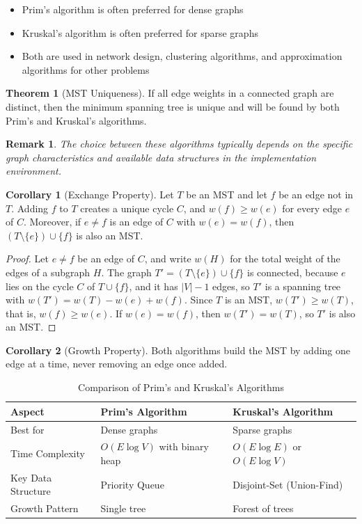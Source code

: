 \documentclass{article}
\newtheorem{remark}{Remark}
\theoremstyle{definition}
\newtheorem{theorem}{Theorem}
\newtheorem{corollary}{Corollary}
\begin{document}
\begin{itemize}
\item Prim's algorithm is often preferred for dense graphs
\item Kruskal's algorithm is often preferred for sparse graphs
\item Both are used in network design, clustering algorithms, and approximation algorithms for other problems
\end{itemize}

\begin{theorem}[MST Uniqueness]
If all edge weights in a connected graph are distinct, then the minimum spanning tree is unique and will be found by both Prim's and Kruskal's algorithms.
\end{theorem}

\begin{remark}
The choice between these algorithms typically depends on the specific graph characteristics and available data structures in the implementation environment.
\end{remark}

\begin{corollary}[Exchange Property]
Let $T$ be an MST and let $f$ be an edge not in $T$. Adding $f$ to $T$ creates a unique cycle $C$, and $w(f) \geq w(e)$ for every edge $e$ of $C$. Moreover, if $e \neq f$ is an edge of $C$ with $w(e) = w(f)$, then $(T \setminus \{e\}) \cup \{f\}$ is also an MST.
\end{corollary}
\begin{proof}
Let $e \neq f$ be an edge of $C$, and write $w(H)$ for the total weight of the edges of a subgraph $H$. The graph $T' = (T \setminus \{e\}) \cup \{f\}$ is connected, because $e$ lies on the cycle $C$ of $T \cup \{f\}$, and it has $|V| - 1$ edges, so $T'$ is a spanning tree with $w(T') = w(T) - w(e) + w(f)$. Since $T$ is an MST, $w(T') \geq w(T)$, that is, $w(f) \geq w(e)$. If $w(e) = w(f)$, then $w(T') = w(T)$, so $T'$ is also an MST.
\end{proof}

\begin{corollary}[Growth Property]
Both algorithms build the MST by adding one edge at a time, never removing an edge once added.
\end{corollary}

\begin{table}[h]
\centering
\begin{tabular}{|l|l|l|}
\hline
\textbf{Aspect} & \textbf{Prim's Algorithm} & \textbf{Kruskal's Algorithm} \\
\hline
Best for & Dense graphs & Sparse graphs \\
\hline
Time Complexity & $O(E \log V)$ with binary heap & $O(E \log E)$ or $O(E \log V)$ \\
\hline
Key Data Structure & Priority Queue & Disjoint-Set (Union-Find) \\
\hline
Growth Pattern & Single tree & Forest of trees \\
\hline
\end{tabular}
\caption{Comparison of Prim's and Kruskal's Algorithms}
\end{table}
\end{document}
